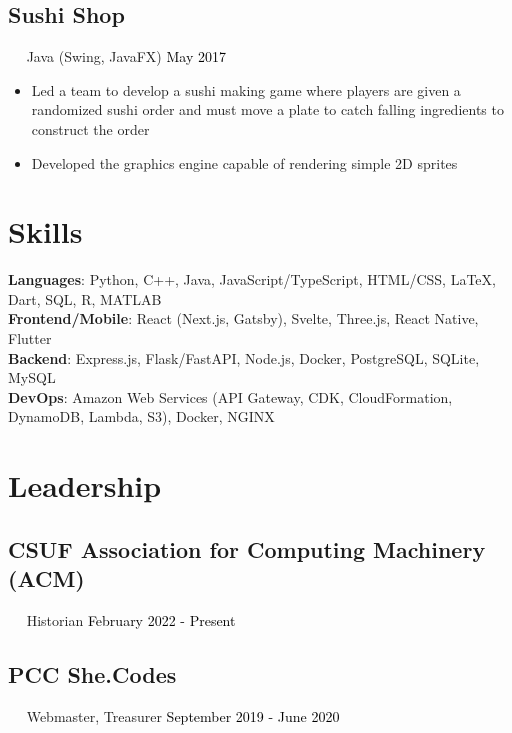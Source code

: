 \documentclass{article}
\newcommand{\resumesection}[3]{
    \subsection*{#1}
    \ 
    \ 
    \small
    \textcolor{csufgrey}{#2}
    \normalsize
    \hfill
    \textcolor{black}{#3}
    \normalsize
}
\begin{document}

\resumesection{Sushi Shop}{Java (Swing, JavaFX)}{May 2017}
\begin{itemize}
    \item Led a team to develop a sushi making game where players are given a randomized sushi order and must move a plate to catch falling ingredients to construct the order
    \item Developed the graphics engine capable of rendering simple 2D sprites
\end{itemize}
\section*{Skills}
\textbf{Languages}: Python, C++, Java, JavaScript/TypeScript, HTML/CSS, {\selectfont\LaTeX}, Dart, SQL, R, MATLAB\\
\textbf{Frontend/Mobile}: React (Next.js, Gatsby), Svelte, Three.js, React Native, Flutter\\
\textbf{Backend}: Express.js, Flask/FastAPI, Node.js, Docker, PostgreSQL, SQLite, MySQL\\
\textbf{DevOps}: Amazon Web Services (API Gateway, CDK, CloudFormation, DynamoDB, Lambda, S3), Docker, NGINX
\section*{Leadership}
\resumesection{CSUF Association for Computing Machinery (ACM)}{Historian}{February 2022 - Present}
\resumesection{PCC She.Codes}{Webmaster, Treasurer}{September 2019 - June 2020}
\end{document}
